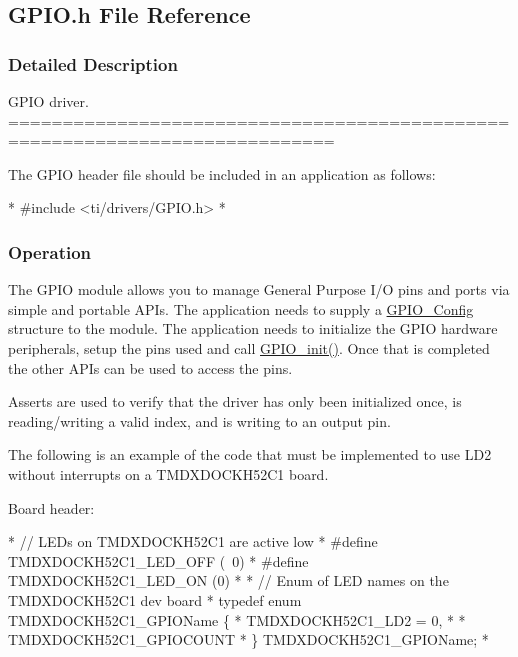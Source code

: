 \subsection{G\-P\-I\-O.\-h File Reference}
\label{_g_p_i_o_8h}


\subsubsection{Detailed Description}
G\-P\-I\-O driver. ============================================================================

The G\-P\-I\-O header file should be included in an application as follows\-: 
\begin{DoxyCode}
*  #include <ti/drivers/GPIO.h>
*  
\end{DoxyCode}


\subsubsection*{Operation}

The G\-P\-I\-O module allows you to manage General Purpose I/\-O pins and ports via simple and portable A\-P\-Is. The application needs to supply a \hyperlink{struct_g_p_i_o___config}{G\-P\-I\-O\-\_\-\-Config} structure to the module. The application needs to initialize the G\-P\-I\-O hardware peripherals, setup the pins used and call \hyperlink{_g_p_i_o_8h_a75690af9e89afd801dc40b20b5c813f1}{G\-P\-I\-O\-\_\-init()}. Once that is completed the other A\-P\-Is can be used to access the pins.

Asserts are used to verify that the driver has only been initialized once, is reading/writing a valid index, and is writing to an output pin.

The following is an example of the code that must be implemented to use L\-D2 without interrupts on a T\-M\-D\-X\-D\-O\-C\-K\-H52\-C1 board.

Board header\-: 
\begin{DoxyCode}
*  \textcolor{comment}{// LEDs on TMDXDOCKH52C1 are active low}
*  #define TMDXDOCKH52C1\_LED\_OFF (~0)
*  #define TMDXDOCKH52C1\_LED\_ON  (0)
*
*  \textcolor{comment}{// Enum of LED names on the TMDXDOCKH52C1 dev board}
*  \textcolor{keyword}{typedef} \textcolor{keyword}{enum} TMDXDOCKH52C1\_GPIOName \{
*      TMDXDOCKH52C1\_LD2 = 0,
*
*      TMDXDOCKH52C1\_GPIOCOUNT
*  \} TMDXDOCKH52C1\_GPIOName;
*  
\end{DoxyCode}


